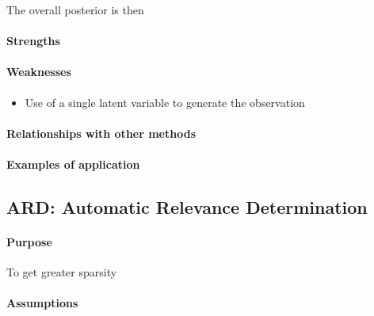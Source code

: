 The overall posterior is then
\begin{center}
\end{center}




\paragraph{Strengths}

\paragraph{Weaknesses}
\begin{itemize}
    \item Use of a single latent variable to generate the observation
\end{itemize}

\paragraph{Relationships with other methods}
\paragraph{Examples of application}


\subsection{ARD: Automatic Relevance Determination}
\paragraph{Purpose}
To get greater sparsity 
\paragraph{Assumptions}
